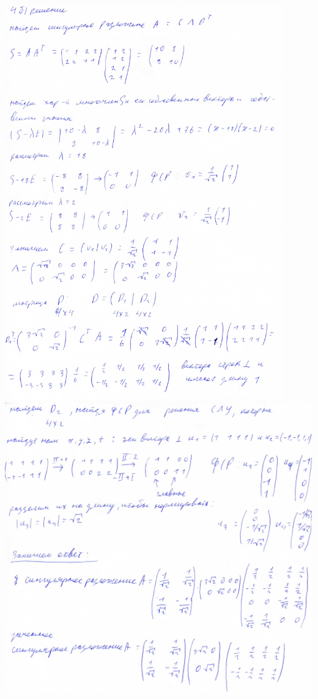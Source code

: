 \documentclass[a4paper,12pt]{article}
\begin{document}
\begin{enumerate}
\includegraphics[width=0.9\textwidth]{img/img205.pdf}\\
\includegraphics[width=\textwidth]{img/img206.pdf}


\end{enumerate}
\end{document}
